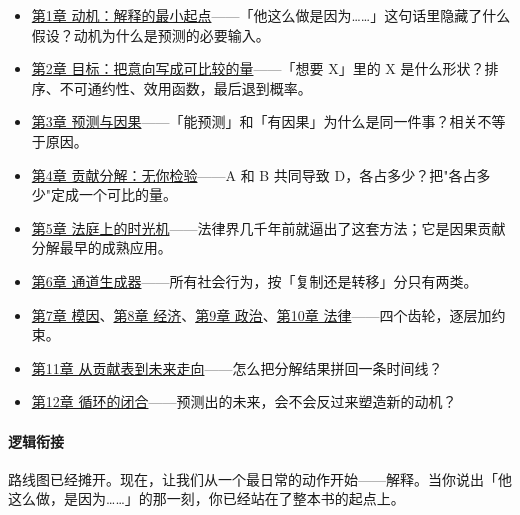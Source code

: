 \documentclass[../../main2.tex]{subfiles}
\begin{document}
	\begin{itemize}
		\item \hyperref[ch:motivation]{第1章 动机：解释的最小起点}——「他这么做是因为……」这句话里隐藏了什么假设？动机为什么是预测的必要输入。
		\item \hyperref[ch:goal]{第2章 目标：把意向写成可比较的量}——「想要 X」里的 X 是什么形状？排序、不可通约性、效用函数，最后退到概率。
		\item \hyperref[ch:prediction]{第3章 预测与因果}——「能预测」和「有因果」为什么是同一件事？相关不等于原因。
		\item \hyperref[ch:contribution]{第4章 贡献分解：无你检验}——A 和 B 共同导致 D，各占多少？把"各占多少"定成一个可比的量。
		\item \hyperref[ch:law-method]{第5章 法庭上的时光机}——法律界几千年前就逼出了这套方法；它是因果贡献分解最早的成熟应用。
		\item \hyperref[ch:channels]{第6章 通道生成器}——所有社会行为，按「复制还是转移」分只有两类。
		\item \hyperref[ch:meme]{第7章 模因}、\hyperref[ch:economy]{第8章 经济}、\hyperref[ch:politics]{第9章 政治}、\hyperref[ch:law]{第10章 法律}——四个齿轮，逐层加约束。
		\item \hyperref[ch:forecast]{第11章 从贡献表到未来走向}——怎么把分解结果拼回一条时间线？
		\item \hyperref[ch:closure]{第12章 循环的闭合}——预测出的未来，会不会反过来塑造新的动机？
	\end{itemize}

	\paragraph*{逻辑衔接}
	路线图已经摊开。现在，让我们从一个最日常的动作开始——解释。当你说出「他这么做，是因为……」的那一刻，你已经站在了整本书的起点上。
\end{document}
